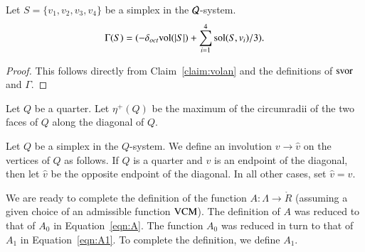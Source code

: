 \begin{lemma}\label{lemma:gammavol}
Let $S=\{v_1,v_2,v_3,v_4\}$ be a simplex in the ${\mathcal Q}$-system.
    $$\Gamma(S) = (-\delta_{oct} {\operatorname{vol}}(|S|) +\sum_{i=1}^4
    \operatorname{sol}(S,v_i)/3).
    $$
\end{lemma}

\begin{proof} This follows directly from Claim~\ref{claim:volan}
and the definitions of $\operatorname{svor}$ and $\Gamma$.
\end{proof}

\begin{definition}
Let $Q$ be a quarter.   Let $\eta^+(Q)$ be the maximum of the
circumradii of the two faces of $Q$ along the diagonal of $Q$.
\end{definition}

Let $Q$ be a simplex in the $Q$-system.  We define an involution
$v\to \hat v$ on the vertices of $Q$ as follows.  If $Q$ is a
quarter and $v$ is an endpoint of the diagonal, then let $\hat v$
be the opposite endpoint of the diagonal.  In all other cases, set
$\hat v = v$.

We are ready to complete the definition of the function
$A:\Lambda\to\ring{R}$ (assuming a given choice of an admissible
function ${\operatorname{VCM}}$). The definition of $A$ was reduced to that of
$A_0$ in Equation~\ref{eqn:A}.  The function $A_0$ was reduced in
turn to that of $A_1$ in Equation~\ref{eqn:A1}. To complete the
definition, we define $A_1$.

